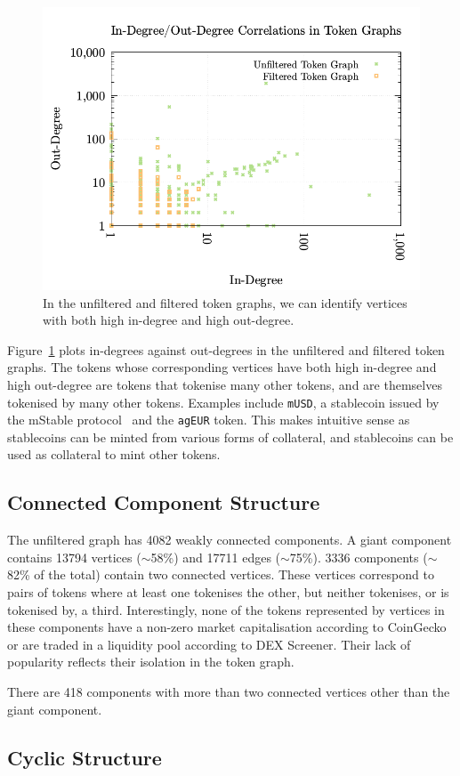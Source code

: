 \begin{figure}
  \centerline{\includegraphics[width=\columnwidth]{img/degree-distributions/token-graph-in-out-degrees.png}}
  \caption{In the unfiltered and filtered token graphs, we can
    identify vertices with both high in-degree and high
    out-degree.}\label{fig:token-graph-in-out-degrees}
\end{figure}

Figure~\ref{fig:token-graph-in-out-degrees} plots in-degrees against
out-degrees in the unfiltered and filtered token graphs.  The tokens
whose corresponding vertices have both high in-degree and high
out-degree are tokens that tokenise many other tokens, and are
themselves tokenised by many other tokens.  Examples include
\texttt{mUSD}, a stablecoin issued by the mStable
protocol~\cite{mstable-xx} and the \texttt{agEUR} token.  This makes
intuitive sense as stablecoins can be minted from various forms of
collateral, and stablecoins can be used as collateral to mint other
tokens.

\subsection{Connected Component Structure}\label{sec:analysis-component-structure}

The unfiltered graph has \num{4082} weakly connected components.  A
giant component contains \num{13794} vertices ($\sim$\num{58}\%) and
\num{17711} edges ($\sim$\num{75}\%).  \num{3336} components
($\sim$\num{82}\% of the total) contain two connected vertices.  These
vertices correspond to pairs of tokens where at least one tokenises
the other, but neither tokenises, or is tokenised by, a third.
Interestingly, none of the tokens represented by vertices in these
components have a non-zero market capitalisation according to
CoinGecko or are traded in a liquidity pool according to DEX Screener.
Their lack of popularity reflects their isolation in the token graph.

There are \num{418} components with more than two connected vertices
other than the giant component.

\subsection{Cyclic Structure}\label{sec:analysis-cyclic-structure}
